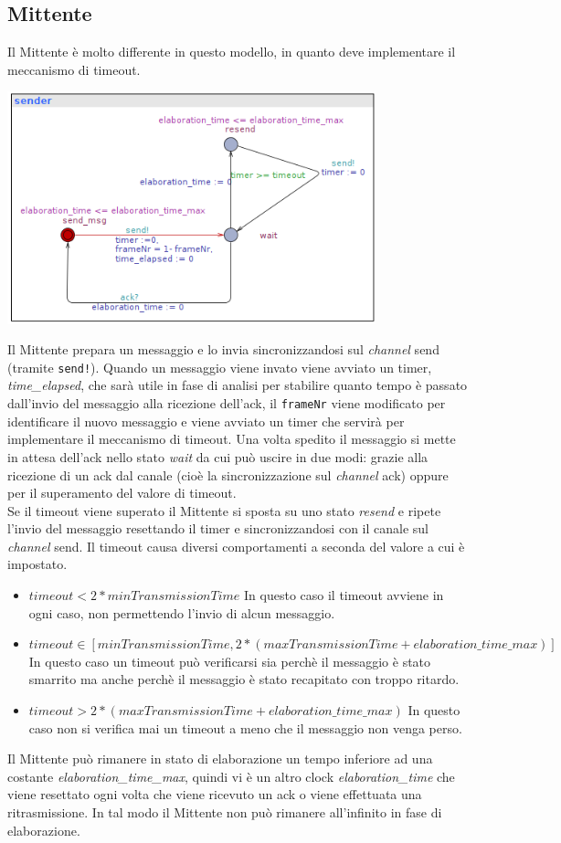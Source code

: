 \documentclass[a4paper]{article}
\newcommand{\channel}{\textit{channel }}
\begin{document}
\subsection{Mittente}
Il Mittente è molto differente in questo modello, in quanto deve implementare il meccanismo di timeout.
\begin{center}\includegraphics[width=0.8\textwidth]{2_sender.png}\end{center}
Il Mittente prepara un messaggio e lo invia sincronizzandosi sul \channel send (tramite \texttt{send!}).
Quando un messaggio viene invato viene avviato un timer, \textit{time\_elapsed}, che sarà utile in fase di analisi per stabilire quanto tempo è passato dall'invio del messaggio alla ricezione dell'ack, il \texttt{frameNr} viene modificato per identificare il nuovo messaggio e viene avviato un timer che servirà per implementare il meccanismo di timeout.
Una volta spedito il messaggio si mette in attesa dell'ack nello stato \textit{wait} da cui può uscire in due modi: grazie alla ricezione di un ack dal canale (cioè la sincronizzazione sul \channel ack) oppure per il superamento del valore di timeout.\\
Se il timeout viene superato il Mittente si sposta su uno stato \textit{resend} e ripete l'invio del messaggio resettando il timer e sincronizzandosi con il canale sul \channel send.
Il timeout causa diversi comportamenti a seconda del valore a cui è impostato.
\begin{itemize}
	\item $timeout < 2 * minTransmissionTime$ In questo caso il timeout avviene in ogni caso, non permettendo l'invio di alcun messaggio.
	\item $timeout \in [minTransmissionTime, 2 * (maxTransmissionTime + elaboration\_time\_max)]$ In questo caso un timeout può verificarsi sia perchè il messaggio è stato smarrito ma anche perchè il messaggio è stato recapitato con troppo ritardo.
	\item $timeout > 2 * (maxTransmissionTime + elaboration\_time\_max)$ In questo caso non si verifica mai un timeout a meno che il messaggio non venga perso.
\end{itemize}
Il Mittente può rimanere in stato di elaborazione un tempo inferiore ad una costante \textit{elaboration\_time\_max}, quindi vi è un altro clock \textit{elaboration\_time} che viene resettato ogni volta che viene ricevuto un ack o viene effettuata una ritrasmissione.
In tal modo il Mittente non può rimanere all'infinito in fase di elaborazione.
\end{document}
